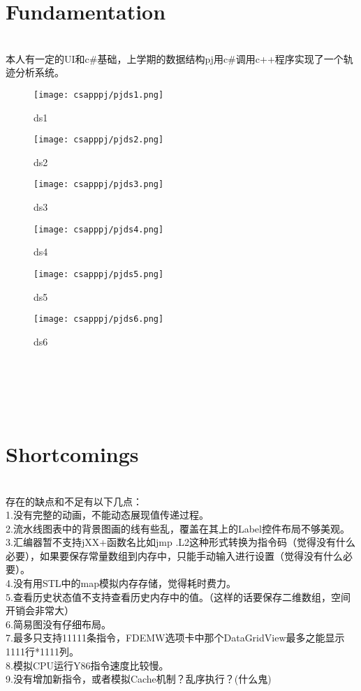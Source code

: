 \documentclass{article}
\begin{document}
\begin{spacing}{1.5}
\section{Fundamentation}
\noindent
{}
\setlength{\hangindent}{2.8em}\\
本人有一定的UI和c\#基础，上学期的数据结构pj用c\#调用c++程序实现了一个轨迹分析系统。
\begin{figure}[htbp]
\centering
\texttt{[image: csapppj/pjds1.png]}
\caption{ds1}
\end{figure}
\begin{figure}[htbp]
\centering
\texttt{[image: csapppj/pjds2.png]}
\caption{ds2}
\end{figure}
\begin{figure}[htbp]
\centering
\texttt{[image: csapppj/pjds3.png]}
\caption{ds3}
\end{figure}
\begin{figure}[htbp]
\centering
\texttt{[image: csapppj/pjds4.png]}
\caption{ds4}
\end{figure}
\begin{figure}[htbp]
\centering
\texttt{[image: csapppj/pjds5.png]}
\caption{ds5}
\end{figure}
\begin{figure}[htbp]
\centering
\texttt{[image: csapppj/pjds6.png]}
\caption{ds6}
\end{figure}
\\ \\ \\ \\
\section{Shortcomings}
\noindent
{}
\setlength{\hangindent}{2.8em}\\
存在的缺点和不足有以下几点：\\
1.没有完整的动画，不能动态展现值传递过程。\\
2.流水线图表中的背景图画的线有些乱，覆盖在其上的Label控件布局不够美观。\\
3.汇编器暂不支持jXX+函数名比如jmp .L2这种形式转换为指令码（觉得没有什么必要），如果要保存常量数组到内存中，只能手动输入进行设置（觉得没有什么必要）。\\
4.没有用STL中的map模拟内存存储，觉得耗时费力。\\
5.查看历史状态值不支持查看历史内存中的值。（这样的话要保存二维数组，空间开销会非常大）\\
6.简易图没有仔细布局。\\
7.最多只支持11111条指令，FDEMW选项卡中那个DataGridView最多之能显示1111行*1111列。\\
8.模拟CPU运行Y86指令速度比较慢。\\
9.没有增加新指令，或者模拟Cache机制？乱序执行？(什么鬼)\\

\end{spacing}
\end{document}
